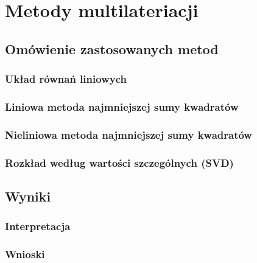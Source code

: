 \chapter{Metody multilateriacji}

\section{Omówienie zastosowanych metod}

\subsection{Układ równań liniowych}

\subsection{Liniowa metoda najmniejszej sumy kwadratów}

\subsection{Nieliniowa metoda najmniejszej sumy kwadratów}

\subsection{Rozkład według wartości szczególnych (SVD)}

\section{Wyniki}

\subsection{Interpretacja}

\subsection{Wnioski}
